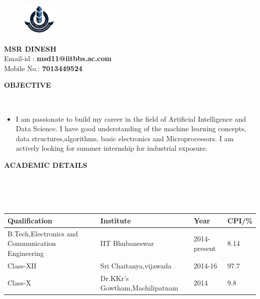 \documentclass[a4paper,10pt]{article}
\newcommand{\lsep}{-0.5cm}
\newcommand{\resheading}[1]{{\small \colorbox{mygrey}{\begin{minipage}{0.975\textwidth}{\textbf{#1 \vphantom{p\^{E}}}}\end{minipage}}}}
\begin{document}
\linespread{0.25}
\hspace{0.5cm}\\[-0.25cm]
\begin{figure}
\begin{flushleft}
\includegraphics[width=0.145\textwidth, left]{logo}
\end{flushleft}
\end{figure}


\begin{flushright}
\bigbreak
\bigbreak
\bigbreak
\bigbreak
\bigbreak
\textbf{MSR DINESH} \\
\noindent Email-id : \textbf{msd11@iitbbs.ac.com} \\
\noindent Mobile No.: \textbf{7013449524} \\
\end{flushright}
\bigbreak
\bigbreak
\resheading{\textbf{OBJECTIVE} }\\[\lsep]
\begin{itemize}
\item \noindent I am passionate to  build my career in the field of Artificial Intelligence and Data Science. I have   good understanding of the machine learning concepts, data structures,algorithms,  basic electronics and  Microprocessors. I am actively looking for summer internship for industrial exposure.

\end{itemize}


\resheading{\textbf{ACADEMIC DETAILS} }\\[\lsep]
\\ \\
\indent \begin{tabular}{ l @{\hskip 0.45in} l @{\hskip 0.45in} l @{\hskip 0.45in} l}
\hline
\textbf{Qualification} &  \textbf{Institute} & \textbf{Year} & \textbf{CPI/\%} \\
\hline
B.Tech,Electronics and Communication Engineering & IIT Bhubaneswar & 2014-present & 8.14 \\
Class-XII & Sri Chaitanya,vijawada & 2014-16 & 97.7\\
Class-X & Dr.KKr's Gowtham,Machilipatnam & 2014 & 9.8 \\

\hline
\end{tabular}
\\ \\
\end{document}
